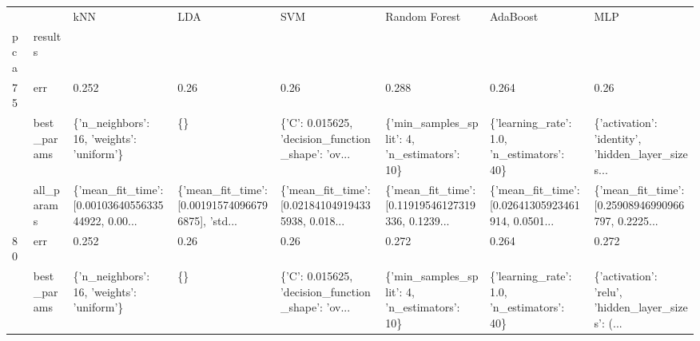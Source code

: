 \begin{tabular}{llllllll}
\toprule
    &            &                                                kNN &                                                LDA &                                                SVM &                                      Random Forest &                                           AdaBoost &                                                MLP \\
pca & results &                                                    &                                                    &                                                    &                                                    &                                                    &                                                    \\
\midrule
75  & err &                                              0.252 &                                               0.26 &                                               0.26 &                                              0.288 &                                              0.264 &                                               0.26 \\
    & best\_params &          \{'n\_neighbors': 16, 'weights': 'uniform'\} &                                                 \{\} &  \{'C': 0.015625, 'decision\_function\_shape': 'ov... &       \{'min\_samples\_split': 4, 'n\_estimators': 10\} &         \{'learning\_rate': 1.0, 'n\_estimators': 40\} &  \{'activation': 'identity', 'hidden\_layer\_sizes... \\
    & all\_params &  \{'mean\_fit\_time': [0.0010364055633544922, 0.00... &  \{'mean\_fit\_time': [0.001915740966796875], 'std... &  \{'mean\_fit\_time': [0.021841049194335938, 0.018... &  \{'mean\_fit\_time': [0.11919546127319336, 0.1239... &  \{'mean\_fit\_time': [0.02641305923461914, 0.0501... &  \{'mean\_fit\_time': [0.25908946990966797, 0.2225... \\
80  & err &                                              0.252 &                                               0.26 &                                               0.26 &                                              0.272 &                                              0.264 &                                              0.272 \\
    & best\_params &          \{'n\_neighbors': 16, 'weights': 'uniform'\} &                                                 \{\} &  \{'C': 0.015625, 'decision\_function\_shape': 'ov... &       \{'min\_samples\_split': 4, 'n\_estimators': 10\} &         \{'learning\_rate': 1.0, 'n\_estimators': 40\} &  \{'activation': 'relu', 'hidden\_layer\_sizes': (... \\

\end{tabular}
